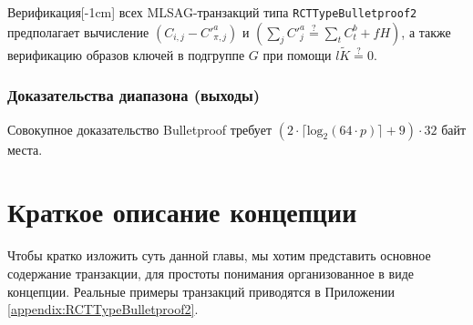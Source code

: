 Верификация[-1cm] всех MLSAG-транзакций типа {\tt RCTTypeBulletproof2} предполагает вычисление \( (C_{i, j} - C'^a_{\pi, j}) \) и \( (\sum_j C'^a_{j} \stackrel{?}{=} \sum_t C^b_{t} + f H)\), а также верификацию образов ключей в подгруппе $G$ при помощи $l \tilde{K} \stackrel{?}{=} 0$.

\subsubsection*{Доказательства диапазона (выходы)}

Совокупное доказательство Bulletproof требует $(2 \cdot \lceil \textrm{log}_2(64 \cdot p) \rceil + 9) \cdot 32$ байт места.



\newpage
\section{Краткое описание концепции}
\label{sec:transaction_summary}

Чтобы кратко изложить суть данной главы, мы хотим представить основное содержание транзакции, для простоты понимания организованное в виде концепции. Реальные примеры транзакций приводятся в Приложении \ref{appendix:RCTTypeBulletproof2}.

